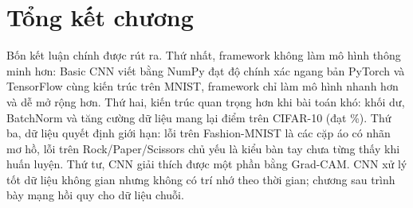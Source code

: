 
\section{Tổng kết chương}
Bốn kết luận chính được rút ra. Thứ nhất, framework không làm mô hình thông minh hơn: Basic CNN viết bằng NumPy đạt độ chính xác ngang bản PyTorch và TensorFlow cùng kiến trúc trên MNIST, framework chỉ làm mô hình nhanh hơn và dễ mở rộng hơn. Thứ hai, kiến trúc quan trọng hơn khi bài toán khó:
khối dư, BatchNorm và tăng cường dữ liệu mang lại  điểm trên CIFAR-10 (đạt \%). Thứ ba, dữ liệu quyết định giới hạn: lỗi trên Fashion-MNIST là các cặp áo có nhãn mơ hồ, lỗi trên Rock/Paper/Scissors chủ yếu là kiểu bàn tay chưa
từng thấy khi huấn luyện. Thứ tư, CNN giải thích được một phần bằng Grad-CAM. CNN xử lý tốt dữ liệu không gian nhưng không có trí nhớ theo thời gian; chương sau trình bày mạng hồi quy cho dữ liệu chuỗi.
